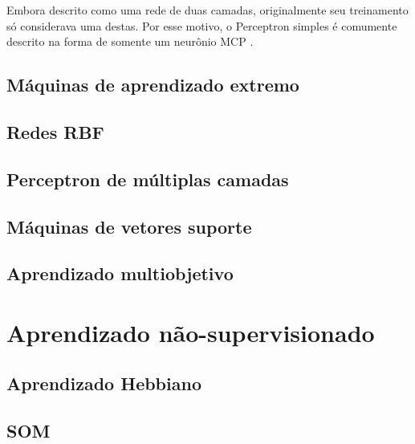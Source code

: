 \documentclass[conference]{IEEEtran}
\begin{document}
	Embora descrito como uma rede de duas camadas, originalmente seu treinamento só considerava uma destas. Por esse motivo, o Perceptron simples é comumente descrito na forma de somente um neurônio MCP \cite{mcculloch1943logical}.  
	
	

	\subsection{Máquinas de aprendizado extremo}
	\subsection{Redes RBF}
	\subsection{Perceptron de múltiplas camadas}
	\subsection{Máquinas de vetores suporte}
	\subsection{Aprendizado multiobjetivo}
	\section{Aprendizado não-supervisionado}
	\subsection{Aprendizado Hebbiano}
	\subsection{SOM}

\end{document}
